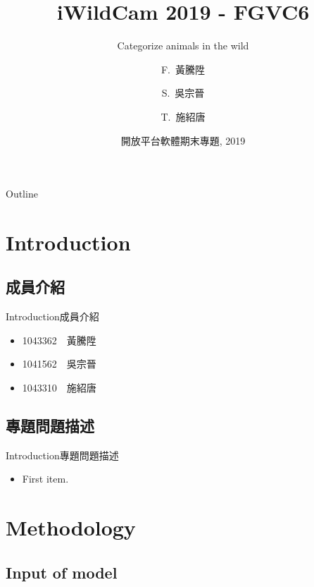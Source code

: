 \documentclass{beamer}
\title{iWildCam 2019 - FGVC6}
\subtitle{Categorize animals in the wild}
\author{F.~黃騰陞\inst{1} \and S.~吳宗晉\inst{2} \and T.~施紹唐\inst{3}}
\institute[Universities of Somewhere and Elsewhere] %
{
  \inst{1}%
  Department of Computer Science\\
  University of Yuan Ze
}
\date{開放平台軟體期末專題, 2019}
\begin{document}
\begin{CJK}{UTF8}{}
\begin{frame}
  \titlepage
\end{frame}

\begin{frame}{Outline}
\setcounter{tocdepth}{1}
  \tableofcontents
\end{frame}

\section{Introduction}

\subsection{成員介紹}

\begin{frame}{Introduction}{成員介紹}
  \begin{itemize}
  \item {
    1043362　黃騰陞
  }
  \item {
    1041562　吳宗晉

  }
  \item {
    1043310　施紹唐	
  }
  \end{itemize}
\end{frame}

\subsection{專題問題描述}

\begin{frame}{Introduction}{專題問題描述}
  \begin{itemize}
  \item {
    First item.
    \pause %
  }
  
  \end{itemize}
\end{frame}

\section{Methodology}

\subsection{Input of model}


\end{CJK}
\end{document}
